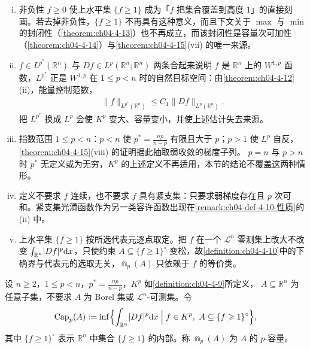 \documentclass[../../main.tex]{subfiles}%
\begin{document}
\begin{remark}\label{remark:ch04-def-4-9-条件}
\begin{enumerate}[(i)]
\item 非负性 $f\geqslant0$ 使上水平集 $\{f\geqslant1\}$ 成为「$f$ 把集合覆盖到高度 $1$」的直接刻画。若去掉非负性，$\{f\geqslant1\}$ 不再具有这种意义，而且下文关于 $\max$ 与 $\min$ 的封闭性（\cref{theorem:ch04-4-13}）也不再成立，而该封闭性是容量次可加性（\cref{theorem:ch04-4-14}）与\cref{theorem:ch04-4-15}(vii) 的唯一来源。%
\item $f\in L^{p^*}(\mathbb{R}^n)$ 与 $Df\in L^p(\mathbb{R}^n;\mathbb{R}^n)$ 两条合起来说明 $f$ 是 $\mathbb{R}^n$ 上的 $W^{1,p}$ 函数，$L^{p^*}$ 正是 $W^{1,p}$ 在 $1\leqslant p<n$ 时的自然目标空间：由\cref{theorem:ch04-4-12}(ii)，能量控制范数，%
\begin{align*}
\lVert f\rVert_{L^{p^*}(\mathbb{R}^n)}\leqslant C_1\lVert Df\rVert_{L^p(\mathbb{R}^n)}.
\end{align*}
把 $L^{p^*}$ 换成 $L^p$ 会使 $K^p$ 变大、容量变小，并使上述估计失去来源。
\item 指数范围 $1\leqslant p<n$：$p<n$ 使 $p^*=\frac{np}{n-p}$ 有限且大于 $p$；$p>1$ 使 $L^p$ 自反，\cref{theorem:ch04-4-15}(viii) 的证明据此抽取弱收敛的梯度子列。%
$p=n$ 与 $p>n$ 时 $p^*$ 无定义或为无穷，$K^p$ 的上述定义不再适用，本节的结论不覆盖这两种情形。
\item 定义不要求 $f$ 连续，也不要求 $f$ 具有紧支集：只要求弱梯度存在且 $p$ 次可和。紧支集光滑函数作为另一类容许函数出现在\cref{remark:ch04-def-4-10-性质}的 (ii) 中。%
\item 上水平集 $\{f\geqslant1\}$ 按所选代表元逐点取定。把 $f$ 在一个 $\mathcal{L}^n$ 零测集上改大不改变 $\int_{\mathbb{R}^n}\lvert Df\rvert^p\mathrm{d} x$，只使约束 $A\subseteq\{f\geqslant1\}^{\circ}$ 变松，故\cref{definition:ch04-4-10}中的下确界与代表元的选取无关，$\Cap_p(A)$ 只依赖于 $f$ 的等价类。%
\end{enumerate}
\end{remark}

\begin{definition}\label{definition:ch04-4-10}
设 $n\geqslant2$，$1\leqslant p<n$，$p^*=\frac{np}{n-p}$，$K^p$ 如\cref{definition:ch04-4-9}所定义，%
$A\subseteq\mathbb{R}^n$ 为任意子集，不要求 $A$ 为 Borel 集或 $\mathcal{L}^n$-可测集。令
\begin{align*}
\operatorname{Cap}_p(A):=\inf\Bigl\{\int_{\mathbb{R}^n}\lvert Df\rvert^p\mathrm{d} x\Bigm|f\in K^p,\ A\subseteq\{f\geqslant1\}^{\circ}\Bigr\},
\end{align*}
其中 $\{f\geqslant1\}^{\circ}$ 表示 $\mathbb{R}^n$ 中集合 $\{f\geqslant1\}$ 的内部。称 $\Cap_p(A)$ 为 $A$ 的 $p$-容量。
\end{definition}
\end{document}
